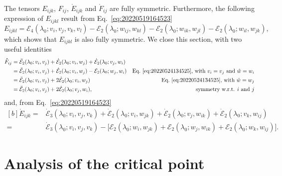 \documentclass[12pt, final]{scrartcl}
\theoremstyle{definition}
\newcommand{\E}{\mathcal E}
\begin{document}
The tensors $E_{ijk}$, $F_{ij}$, $\mathring{E}_{ijk}$ and
$\mathring{F}_{ij}$ are fully symmetric. Furthermore, the following expression
of $E_{ijkl}$ result from Eq.~\eqref{eq:20220519164523}
\begin{equation}
  \label{eq:20220802081116}
  E_{ijkl} = \E_4(\lambda_0 ; v_i, v_j, v_k, v_l) - \E_2(\lambda_0 ; w_{ij}, w_{kl}) - \E_2(\lambda_0 ; w_{ik}, w_{jl}) - \E_2(\lambda_0 ; w_{il}, w_{jk}),
\end{equation}
which shows that $E_{ijkl}$ is also fully symmetric. We close this section,
with two useful identities
\begin{equation}
  \label{eq:20220617084433}
  \begin{aligned}[b]
    \mathring{F}_{ij} ={} & \ddot{\E}_2(\lambda_0; v_i, v_j) + \dot{\E}_2(\lambda_0; v_i, w_j) + \dot{\E}_2(\lambda_0; v_j, w_i)\\
    ={} & \ddot{\E}_2(\lambda_0; v_i, v_j) + \dot{\E}_2(\lambda_0; v_i, w_j) - \E_2(\lambda_0; w_j, w_i) & \text{Eq.~\eqref{eq:20220524134525}, with $v_i = v_j$ and $\hat{w} = w_i$}\\
    ={} & \ddot{\E}_2(\lambda_0; v_i, v_j)  + 2\dot{\E}_2(\lambda_0; v_i, w_j) & \text{Eq.~\eqref{eq:20220524134525}, with $\hat{w} = w_j$}\\
    ={} & \ddot{\E}_2(\lambda_0; v_i, v_j) + 2\dot{\E}_2(\lambda_0; v_j, w_i), & \text{symmetry w.r.t. $i$ and $j$}
  \end{aligned}
\end{equation}
and, from Eq.~\eqref{eq:20220519164523}
\begin{equation}
  \label{eq:20220617085256}
  \begin{aligned}[b]
  \mathring{E}_{ijk} ={}& \dot{\E}_3(\lambda_0; v_i, v_j, v_k) + \dot{\E}_2(\lambda_0; v_i, w_{jk}) + \dot{\E}_2(\lambda_0; v_j, w_{ik}) + \dot{\E}_2(\lambda_0; v_k, w_{ij})\\
  ={}& \dot{\E}_3(\lambda_0; v_i, v_j, v_k) - \bigl[\E_2(\lambda_0; w_i, w_{jk}) + \E_2(\lambda_0; w_j, w_{ik}) + \E_2(\lambda_0; w_k, w_{ij})\bigr].
  \end{aligned}
\end{equation}

\section{Analysis of the critical point}
\label{sec:20220802061621}
\end{document}
